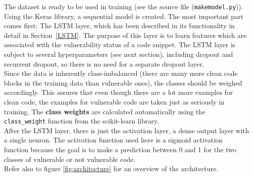\documentclass[
a4paper,
pagesize,
pdftex,
12pt,
twoside, %
BCOR=5mm, %
ngerman,
fleqn,
final,
]{scrartcl}
\begin{document}
	The dataset is ready to be used in training (see the source file (\texttt{makemodel.py})). Using the Keras library, a sequential model is created. The most important part comes first: The LSTM layer, which has been described in its functionality in detail in Section~\ref{LSTM}. The purpose of this layer is to learn features which are associated with the vulnerability status of a code snippet. The LSTM layer is subject to several hyperparameters (see next section), including dropout and recurrent dropout, so there is no need for a separate dropout layer. \\
	Since the data is inherently class-imbalanced (there are many more clean code blocks in the training data than vulnerable ones), the classes should be weighed accordingly. This assures that even though there are a lot more examples for clean code, the examples for vulnerable code are taken just as seriously in training. The \textbf{class weights} are calculated automatically using the \texttt{class\_weight} function from the scikit-learn library.\\
	After the LSTM layer, there is just the activation layer, a dense output layer with a single neuron. The activation function used here is a sigmoid activation function because the goal is to make a prediction between 0 and 1 for the two classes of vulnerable or not vulnerable code.\\
	Refer also to figure \ref{fig:architecture} for an overview of the architecture.
	
\end{document}
